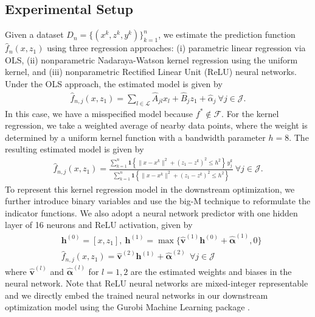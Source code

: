 \documentclass[onefignum,onetabnum]{siamart251216}
\begin{document}
\subsection{Experimental Setup}
Given a dataset $D_n=\{(x^k,z^k,y^k)\}_{k=1}^n$, we estimate the prediction function $\hat f_n(x,z_1)$ using three regression approaches: (i) parametric linear regression via OLS, (ii) nonparametric Nadaraya-Watson kernel regression using the uniform kernel, and (iii) nonparametric Rectified Linear Unit (ReLU) neural networks. Under the OLS approach, the estimated model is given by
\begin{align}\label{eq:estimate-model}
    \hat{f}_{n,j}(x,z_1) = \sum_{l \in \mathcal{L}} \hat{A}_{jl}x_l + \hat{B}_j z_1 + \hat{\alpha}_j\ \forall j \in \mathcal{J}. 
\end{align}
In this case, we have a misspecified model because $f^*\not\in\mathcal{F}$.
For the kernel regression, we take a weighted average of nearby data points, where the weight is determined by a uniform kernel function with a bandwidth parameter $h=8$. The resulting estimated model is given by
\begin{align}\label{eq:kernel regression}
\hat{f}_{n,j}(x,z_1) =
 \frac{\sum_{k=1}^{n} \mathbf{1}\left\{\lVert x-x^{k}\rVert^{2}+(z_1-z^{k})^{2}\le h^{2}\right\} \, y_j^{k}}
{\sum_{k=1}^{n} \mathbf{1}\left\{\lVert x-x^{k}\rVert^{2}+(z_1-z^{k})^{2}\le h^{2}\right\}}
\ \forall j \in \mathcal J.
\end{align}
To represent this kernel regression model in the downstream optimization, we further introduce binary variables and use the big-M technique to reformulate the indicator functions. 
We also adopt a neural network predictor with one hidden layer of 16 neurons and ReLU activation, given by
\begin{align}
&\boldsymbol{h}^{(0)} = [x,z_{1}],\ \boldsymbol{h}^{(1)} = \max\{\hat{\boldsymbol{v}}^{(1)} \boldsymbol{h}^{(0)} + \hat{\boldsymbol{\alpha}}^{(1)},0\} \nonumber\\
    &\hat{f}_{n,j}(x,z_1) = \hat{\boldsymbol{v}}^{(2)} \boldsymbol{h}^{(1)} + \hat{\boldsymbol{\alpha}}^{(2)}\ \  \forall j \in \mathcal{J}\label{eq:NN}
\end{align}
where $\hat{\boldsymbol{v}}^{(l)}$ and $\hat{\boldsymbol{\alpha}}^{(l)}$ for $l=1,2$ are the estimated weights and biases in the neural network.
Note that ReLU neural networks are mixed-integer representable \cite{anderson2020strong} and we directly embed the trained neural networks in our downstream optimization model using the Gurobi Machine Learning package \cite{GurobiML2026}. 
\end{document}

